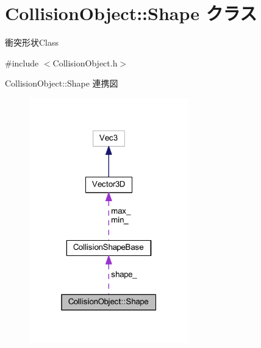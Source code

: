 \hypertarget{class_collision_object_1_1_shape}{}\section{Collision\+Object\+:\+:Shape クラス}
\label{class_collision_object_1_1_shape}


衝突形状\+Class  




{\ttfamily \#include $<$Collision\+Object.\+h$>$}



Collision\+Object\+:\+:Shape 連携図\nopagebreak
\begin{figure}[H]
\begin{center}
\leavevmode
\includegraphics[width=196pt]{class_collision_object_1_1_shape__coll__graph}
\end{center}
\end{figure}
